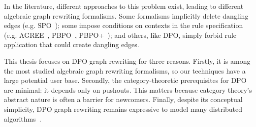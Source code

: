 In the literature, different approaches to this problem exist, leading to different algebraic graph rewriting formalisms. Some formalisms implicitly delete dangling edges (e.g. SPO~\cite{ehrig1997algebraic}); 
some impose conditions on contexts in the rule specification (e.g. AGREE~\cite{corradini2015agree}, PBPO~\cite{corradini2019thepbpo}, PBPO+~\cite{overbeek2023graph}); and others, like DPO, simply forbid rule application that could create dangling edges.

   This thesis focuses on DPO graph rewriting for three reasons.
   Firstly, it is among the most studied algebraic graph rewriting formalisms, so our techniques have a large potential user base.
   Secondly, the category-theoretic prerequisites for DPO are minimal: it depends only on pushouts. This matters because category theory's abstract nature is often a barrier for newcomers.
    Finally, despite its conceptual simplicity, DPO graph rewriting remains expressive to model many distributed algorithms~\cite{ehrig2006fundamentals,corradini1997algebraic}.
  
     \begin{figure}[!ht]
    \centering
    \caption{}
    \label{fig:intro:graph_transformation_rule_0_dpo}
    \end{figure}
    
